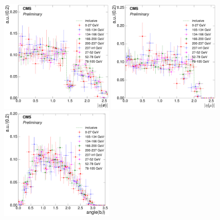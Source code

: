 \begin{figure}[hbtp]
    \centering
     \includegraphics[width=0.48\textwidth]{Chapters/04_Analysis/04b_XSections/images/8TeV/fit_variables/electron/WPT/electron_absolute_eta/vjets/WPT_electron_absolute_eta_2orMoreBtags_VJets_template_comparison.pdf}\hfill
     \includegraphics[width=0.48\textwidth]{Chapters/04_Analysis/04b_XSections/images/8TeV/fit_variables/muon/WPT/muon_absolute_eta/vjets/WPT_muon_absolute_eta_2orMoreBtags_VJets_template_comparison.pdf}\\
     \includegraphics[width=0.48\textwidth]{Chapters/04_Analysis/04b_XSections/images/8TeV/fit_variables/electron/WPT/angle_bl/vjets/WPT_angle_bl_2orMoreBtags_VJets_template_comparison.pdf}\hfill

\end{figure}
